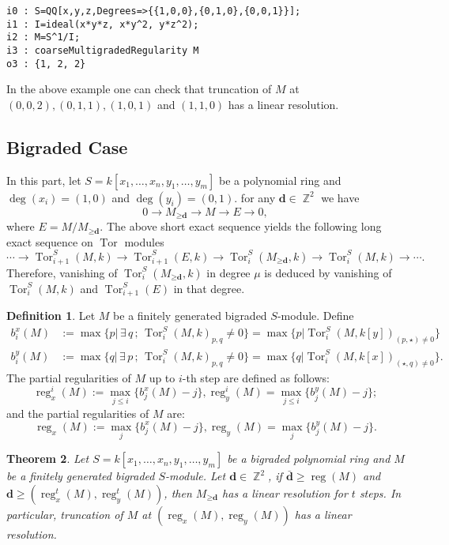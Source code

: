 \documentclass[11pt]{amsart}
\DeclareMathOperator{\reg}{reg}
\DeclareMathOperator{\tor}{Tor}
\DeclareMathOperator{\Tor}{Tor}
\DeclareMathOperator{\Z}{\mathbb{Z}}
\newtheorem{thm}{Theorem}[section]
\theoremstyle{definition}
\newtheorem{dfn}[thm]{Definition}
\begin{document}
  \begin{footnotesize}
 \begin{verbatim}
i0 : S=QQ[x,y,z,Degrees=>{{1,0,0},{0,1,0},{0,0,1}}];
i1 : I=ideal(x*y*z, x*y^2, y*z^2);
i2 : M=S^1/I;
i3 : coarseMultigradedRegularity M
o3 : {1, 2, 2}
\end{verbatim}
\end{footnotesize}
In  the above example one can check that truncation of $M$ at $(0,0,2), (0,1,1), (1,0,1) $ and $(1,1,0)$ has a linear resolution. 

\subsection*{Bigraded Case} In this part, let $S=k[x_1,\dots,x_n,y_1,\dots,y_m]$ be a polynomial ring and $\deg(x_i)=(1,0)$ and $\deg(y_i)=(0,1)$.   for any $\textbf{d}\in \Z^2$ we have
$$
0\rightarrow M_{\geq \textbf{d}} \rightarrow M\rightarrow E\rightarrow 0,
$$
where $E= M/M_{\geq \textbf{d}}$. The above short exact sequence yields the following long exact sequence on $\Tor$ modules
$$
\cdots \rightarrow \Tor_{i+1}^S(M,k)\rightarrow \Tor_{i+1}^S(E,k)\rightarrow 
\Tor_i^S({M_{\geq \textbf{d}}},k)\rightarrow \Tor_i^S(M,k)\rightarrow \cdots .
$$
Therefore, vanishing of $\tor_i^S(M_{\geq \textbf{d}},k)$ in degree $\mu$ is deduced by vanishing of $\tor_i^S(M,k)$ and $\tor_{i+1}^S(E)$ in that degree. 
\begin{dfn}
Let $M$ be a finitely generated bigraded $S$-module. Define
\begin{align*}
b_i^x(M) &:= \max \lbrace p \vert \, \exists \,q \,;\,  \tor_{i}^S(M,k)_{p,q}\neq 0\rbrace = \max \lbrace p \vert \tor_i^S(M, k[y])_{(p,\star)\neq 0}\rbrace\\
b_i^y(M) &:= \max \lbrace q \vert \, \exists \,p \,;\, \tor_{i}^S(M,k)_{p,q}\neq 0\rbrace= \max \lbrace q \vert \tor_i^S(M, k[x])_{(\star,q)\neq 0}\rbrace.
\end{align*}
The partial regularities of $M$ up to $i$-th step are defined as follows:
$$
\reg^i _x(M) := \max_{j\leq i} \lbrace b_j^x(M)-j\rbrace, \reg^i_y(M) = \max_{j\leq i}\lbrace b_j^y(M)-j\rbrace;
$$
and  the partial regularities of $M$ are:
$$
\reg _x(M) := \max_{j} \lbrace b_j^x(M)-j\rbrace, \reg_y(M) = \max_{j}\lbrace b_j^y(M)-j\rbrace.
$$
\end{dfn}
\begin{thm}\label{r=2}
Let $S=k[x_1,\dots,x_n,y_1,\dots, y_m]$ be a bigraded polynomial ring and $M$ be a finitely generated bigraded $S$-module.  Let $\textbf{d}\in \Z^2$, if $\bar{\textbf{d}}\geq \reg(M)$ and $ \textbf{d} \geq  (\reg^t_x(M),\reg^t_y(M))$, then  
$M_{\geq \textbf{d}}$ has a linear resolution for $t$ steps. In particular, truncation of $M$ at $(\reg_x(M),\reg_y(M))$ has a linear resolution.
\end{thm}
\end{document}
